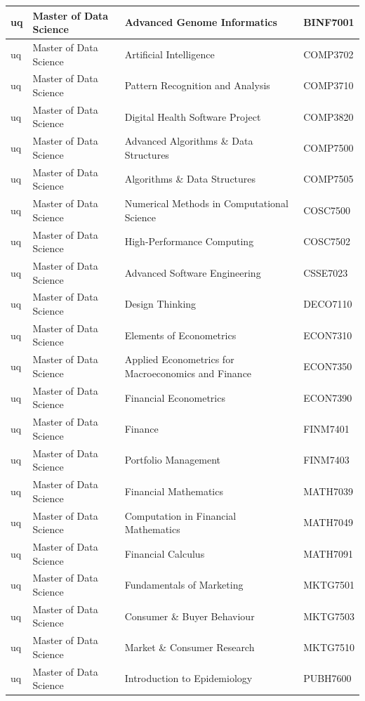 \documentclass[
  letterpaper,
  DIV=11,
  numbers=noendperiod]{scrreport}
\begin{document}
\begin{table}
\begin{tabular}{l|l|l|l}
\hline
uq & Master of Data Science & Advanced Genome Informatics & BINF7001\\
\hline
uq & Master of Data Science & Artificial Intelligence & COMP3702\\
\hline
uq & Master of Data Science & Pattern Recognition and Analysis & COMP3710\\
\hline
uq & Master of Data Science & Digital Health Software Project & COMP3820\\
\hline
uq & Master of Data Science & Advanced Algorithms \& Data Structures & COMP7500\\
\hline
uq & Master of Data Science & Algorithms \& Data Structures & COMP7505\\
\hline
uq & Master of Data Science & Numerical Methods in Computational Science & COSC7500\\
\hline
uq & Master of Data Science & High-Performance Computing & COSC7502\\
\hline
uq & Master of Data Science & Advanced Software Engineering & CSSE7023\\
\hline
uq & Master of Data Science & Design Thinking & DECO7110\\
\hline
uq & Master of Data Science & Elements of Econometrics & ECON7310\\
\hline
uq & Master of Data Science & Applied Econometrics for Macroeconomics and Finance & ECON7350\\
\hline
uq & Master of Data Science & Financial Econometrics & ECON7390\\
\hline
uq & Master of Data Science & Finance & FINM7401\\
\hline
uq & Master of Data Science & Portfolio Management & FINM7403\\
\hline
uq & Master of Data Science & Financial Mathematics & MATH7039\\
\hline
uq & Master of Data Science & Computation in Financial Mathematics & MATH7049\\
\hline
uq & Master of Data Science & Financial Calculus & MATH7091\\
\hline
uq & Master of Data Science & Fundamentals of Marketing & MKTG7501\\
\hline
uq & Master of Data Science & Consumer \& Buyer Behaviour & MKTG7503\\
\hline
uq & Master of Data Science & Market \& Consumer Research & MKTG7510\\
\hline
uq & Master of Data Science & Introduction to Epidemiology & PUBH7600\\

\end{tabular}
\end{table}
\end{document}
